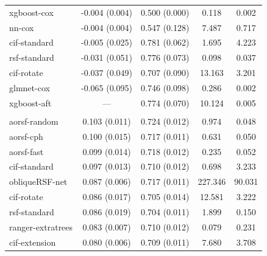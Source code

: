\documentclass[12pt]{article}\usepackage[]{graphicx}\usepackage[]{xcolor}
\newenvironment{knitrout}{}{} %
\begin{document}
\begin{knitrout}
\begin{longtable}[t]{lcccc}
\hspace{1em}xgboost-cox & -0.004 (0.004) & 0.500 (0.000) & 0.118 & 0.002\\
\hspace{1em}nn-cox & -0.004 (0.004) & 0.547 (0.128) & 7.487 & 0.717\\
\hspace{1em}cif-standard & -0.005 (0.025) & 0.781 (0.062) & 1.695 & 4.223\\
\hspace{1em}rsf-standard & -0.031 (0.051) & 0.776 (0.073) & 0.098 & 0.037\\
\hspace{1em}cif-rotate & -0.037 (0.049) & 0.707 (0.090) & 13.163 & 3.201\\
\hspace{1em}glmnet-cox & -0.065 (0.095) & 0.746 (0.098) & 0.286 & 0.002\\
\hspace{1em}xgboost-aft & --- & 0.774 (0.070) & 10.124 & 0.005\\
\addlinespace[0.3em]
\multicolumn{5}{l}{\textit{\textbf{Colon cancer; death, n = 929, p = 12}}}\\
\hline
\hspace{1em}aorsf-random & 0.103 (0.011) & 0.724 (0.012) & 0.974 & 0.048\\
\hspace{1em}aorsf-cph & 0.100 (0.015) & 0.717 (0.011) & 0.631 & 0.050\\
\hspace{1em}aorsf-fast & 0.099 (0.014) & 0.718 (0.012) & 0.235 & 0.052\\
\hspace{1em}cif-standard & 0.097 (0.013) & 0.710 (0.012) & 0.698 & 3.233\\
\hspace{1em}obliqueRSF-net & 0.087 (0.006) & 0.717 (0.011) & 227.346 & 90.031\\
\hspace{1em}cif-rotate & 0.086 (0.017) & 0.705 (0.014) & 12.581 & 3.222\\
\hspace{1em}rsf-standard & 0.086 (0.019) & 0.704 (0.011) & 1.899 & 0.150\\
\hspace{1em}ranger-extratrees & 0.083 (0.007) & 0.710 (0.012) & 0.079 & 0.231\\
\hspace{1em}cif-extension & 0.080 (0.006) & 0.709 (0.011) & 7.680 & 3.708\\

\end{longtable}
\end{knitrout}
\end{document}
